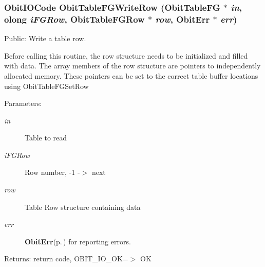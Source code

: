 \subsubsection{\setlength{\rightskip}{0pt plus 5cm}Obit\-IOCode Obit\-Table\-FGWrite\-Row ({\bf Obit\-Table\-FG} $\ast$ {\em in}, {\bf olong} {\em i\-FGRow}, {\bf Obit\-Table\-FGRow} $\ast$ {\em row}, {\bf Obit\-Err} $\ast$ {\em err})}\label{ObitTableFG_8c_a24}


Public: Write a table row. 

Before calling this routine, the row structure needs to be initialized and filled with data. The array members of the row structure are pointers to independently allocated memory. These pointers can be set to the correct table buffer locations using Obit\-Table\-FGSet\-Row \begin{Desc}
\item[Parameters:]
\begin{description}
\item[{\em in}]Table to read \item[{\em i\-FGRow}]Row number, -1 -$>$ next \item[{\em row}]Table Row structure containing data \item[{\em err}]{\bf Obit\-Err}{\rm (p.\,\pageref{structObitErr})} for reporting errors. \end{description}
\end{Desc}
\begin{Desc}
\item[Returns:]return code, OBIT\_\-IO\_\-OK=$>$ OK \end{Desc}
